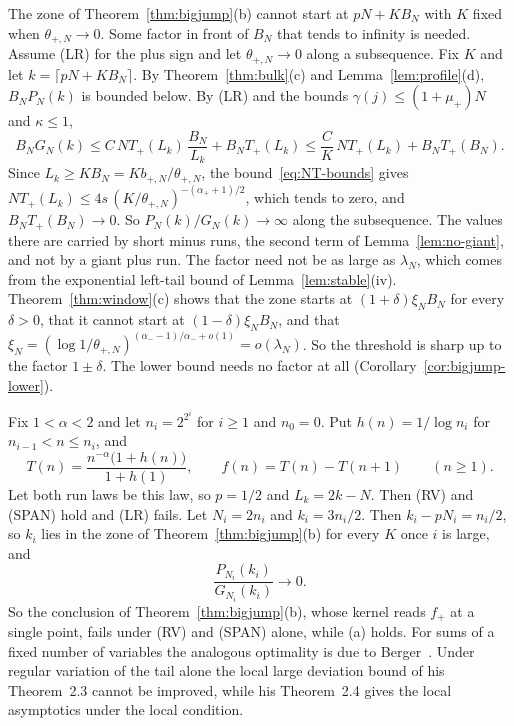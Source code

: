 \begin{remark}\label{rem:theta}
The zone of Theorem~\ref{thm:bigjump}(b) cannot start at $pN+KB_N$ with $K$ fixed
when $\theta_{\plus,N}\to0$. Some factor in front of $B_N$ that tends to infinity is
needed. Assume (LR) for the plus sign and let $\theta_{\plus,N}\to0$ along a
subsequence. Fix $K$ and let $k=\lceil pN+KB_N\rceil$. By Theorem~\ref{thm:bulk}(c)
and Lemma~\ref{lem:profile}(d), $B_NP_N(k)$ is bounded below. By (LR) and the bounds
$\gamma(j)\le(1+\mu_\plus)N$ and $\kappa\le1$,
\[
 B_NG_N(k)\le C\,NT_\plus(L_k)\,\frac{B_N}{L_k}+B_NT_\plus(L_k)
 \le\frac CK\,NT_\plus(L_k)+B_NT_\plus(B_N).
\]
Since $L_k\ge KB_N=Kb_{\plus,N}/\theta_{\plus,N}$, the bound~\eqref{eq:NT-bounds} gives
$NT_\plus(L_k)\le4s\,(K/\theta_{\plus,N})^{-(\alpha_\plus+1)/2}$, which tends to zero,
and $B_NT_\plus(B_N)\to0$. So $P_N(k)/G_N(k)\to\infty$ along the subsequence. The values
there are carried by short minus runs, the second term of Lemma~\ref{lem:no-giant},
and not by a giant plus run. The factor need not be as large as $\lambda_N$, which
comes from the exponential left-tail bound of Lemma~\ref{lem:stable}(iv).
Theorem~\ref{thm:window}(c) shows that the zone starts at $(1+\delta)\xi_NB_N$ for every
$\delta>0$, that it cannot start at $(1-\delta)\xi_NB_N$, and that
$\xi_N=(\log1/\theta_{\plus,N})^{(\alpha_\minus-1)/\alpha_\minus+o(1)}=o(\lambda_N)$. So
the threshold is sharp up to the factor $1\pm\delta$. The lower bound needs no factor
at all (Corollary~\ref{cor:bigjump-lower}).
\end{remark}

\begin{example}[(RV) without (LR)]\label{ex:rv-not-lr}
Fix $1<\alpha<2$ and let $n_i=2^{2^i}$ for $i\ge1$ and $n_0=0$. Put
$h(n)=1/\log n_i$ for $n_{i-1}<n\le n_i$, and
\[
 T(n)=\frac{n^{-\alpha}\bigl(1+h(n)\bigr)}{1+h(1)},\qquad f(n)=T(n)-T(n+1)\qquad(n\ge1).
\]
Let both run laws be this law, so $p=1/2$ and $L_k=2k-N$. Then (RV) and (SPAN)
hold and (LR) fails. Let $N_i=2n_i$ and $k_i=3n_i/2$. Then $k_i-pN_i=n_i/2$, so $k_i$
lies in the zone of Theorem~\ref{thm:bigjump}(b) for every $K$ once $i$ is large,
and
\[
 \frac{P_{N_i}(k_i)}{G_{N_i}(k_i)}\to0 .
\]
So the conclusion of Theorem~\ref{thm:bigjump}(b), whose kernel reads $f_\plus$ at a
single point, fails under (RV) and (SPAN) alone, while (a) holds. For sums of a
fixed number of variables the analogous optimality is due to
Berger~\cite[Eq.~(2.4)]{berger2019ptrf}. Under regular variation of the tail alone
the local large deviation bound of his Theorem~2.3 cannot be improved, while his
Theorem~2.4 gives the local asymptotics under the local condition.
\end{example}


